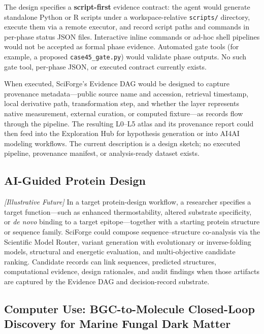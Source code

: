 \documentclass[sn-basic,Numbered,pdflatex]{sn-jnl}
\begin{document}
The design specifies a \textbf{script-first} evidence contract: the agent would generate standalone Python or R scripts under a workspace-relative \texttt{scripts/} directory, execute them via a remote executor, and record script paths and commands in per-phase status JSON files. Interactive inline commands or ad-hoc shell pipelines would not be accepted as formal phase evidence. Automated gate tools (for example, a proposed \texttt{case45\_gate.py}) would validate phase outputs. No such gate tool, per-phase JSON, or executed contract currently exists.

When executed, SciForge's Evidence DAG would be designed to capture provenance metadata---public source name and accession, retrieval timestamp, local derivative path, transformation step, and whether the layer represents native measurement, external curation, or computed fixture---as records flow through the pipeline. The resulting L0--L5 atlas and its provenance report could then feed into the Exploration Hub for hypothesis generation or into AI4AI modeling workflows. The current description is a design sketch; no executed pipeline, provenance manifest, or analysis-ready dataset exists.

\subsection{AI-Guided Protein Design}

\textit{[Illustrative Future]} In a target protein-design workflow, a researcher specifies a target function---such as enhanced thermostability, altered substrate specificity, or \emph{de novo} binding to a target epitope---together with a starting protein structure or sequence family. SciForge could compose sequence--structure co-analysis via the Scientific Model Router, variant generation with evolutionary or inverse-folding models, structural and energetic evaluation, and multi-objective candidate ranking. Candidate records can link sequences, predicted structures, computational evidence, design rationales, and audit findings when those artifacts are captured by the Evidence DAG and decision-record substrate.

\subsection{Computer Use: BGC-to-Molecule Closed-Loop Discovery for Marine Fungal Dark Matter}
\end{document}
